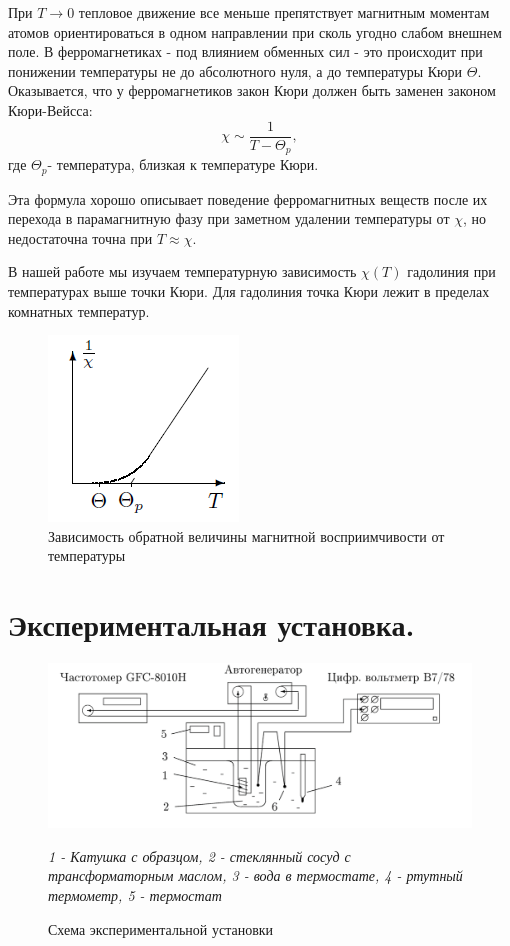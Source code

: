 \documentclass[a4paper, 12pt, twoside]{article}
\begin{document}
При $T\rightarrow 0$ тепловое движение все меньше препятствует магнитным моментам атомов ориентироваться в одном направлении при сколь угодно слабом внешнем поле. В ферромагнетиках -  под влиянием обменных сил -  это происходит при понижении температуры не до абсолютного нуля, а до температуры Кюри $\Theta$. Оказывается, что у ферромагнетиков закон Кюри должен быть заменен законом Кюри-Вейсса:
\begin{equation}
\chi \sim \dfrac{1}{T-\Theta_p} ,
\label{eq2}
\end{equation}
где $\Theta_p$- температура, близкая к температуре Кюри. 

Эта формула хорошо описывает поведение ферромагнитных веществ после их перехода в парамагнитную фазу при заметном удалении температуры от $\chi$, но недостаточна точна при $T \approx \chi$.

В нашей работе мы изучаем температурную зависимость $\chi(T)$ гадолиния при температурах выше точки Кюри. Для гадолиния точка Кюри лежит в пределах комнатных температур.

\begin{figure}[H]
	\centering
	\includegraphics[width = 0.25 \textwidth]{shema1.png}
	\caption{Зависимость обратной величины магнитной восприимчивости от температуры}
\end{figure}
\section{Экспериментальная установка.}

\begin{figure}[H]
	\centering
	\includegraphics[width = 0.8 \textwidth]{shema2}
	\caption{Схема экспериментальной установки}
	
	\textit{1 - Катушка с образцом, 2 - стеклянный сосуд с трансформаторным маслом, 3 - вода в термостате, 4 - ртутный термометр, 5 - термостат}
\end{figure}
\end{document}
